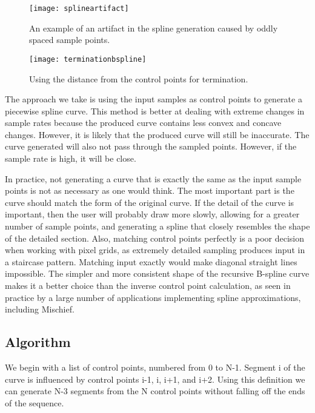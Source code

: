 \begin{center}
\begin{figure}
\begin{center}
\texttt{[image: splineartifact]}
\end{center}
\caption{An example of an artifact in the spline generation caused by oddly spaced sample points.}
\label{fig:splineartifact}
\end{figure}
\begin{figure}
\begin{center}
\texttt{[image: terminationbspline]}
\end{center}
\caption{Using the distance from the control points for termination.}
\end{figure}
\end{center}

The approach we take is using the input samples as control points to generate a piecewise spline curve. 
This method is better at dealing with extreme changes in sample rates because the produced curve contains less convex and concave changes. However, it is likely that the produced curve will still be inaccurate.
The curve generated will also not pass through the sampled points. 
However, if the sample rate is high, it will be close.

In practice, not generating a curve that is exactly the same as the input sample points is not as necessary as one would think. 
The most important part is the curve should match the form of the original curve.
If the detail of the curve is important, then the user will probably draw more slowly, allowing for a greater number of sample points, and generating a spline that closely resembles the shape of the detailed section.
Also, matching control points perfectly is a poor decision when working with pixel grids, as extremely detailed sampling produces input in a staircase pattern.
Matching input exactly would make diagonal straight lines impossible.
The simpler and more consistent shape of the recursive B-spline curve makes it a better choice than the inverse control point calculation, as seen in practice by a large number of applications implementing spline approximations, including Mischief.

\subsection{Algorithm}

We begin with a list of control points, numbered from 0 to N-1. 
Segment i of the curve is influenced by control points i-1, i, i+1, and i+2.
Using this definition we can generate N-3 segments from the N control points without falling off the ends of the sequence.

